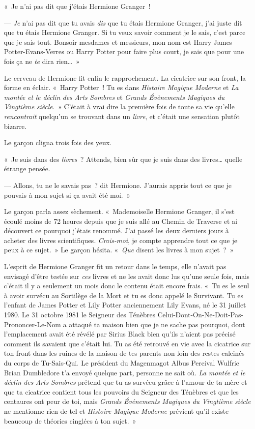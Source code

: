 «~Je n'ai pas dit que j'étais Hermione Granger~!

--- \emph{Je} n'ai pas dit que tu avais \emph{dis} que tu étais Hermione Granger, j'ai juste dit que tu étais Hermione Granger. Si tu veux savoir comment je le sais, c'est parce que je sais tout. Bonsoir mesdames et messieurs, mon nom est Harry James Potter-Evans-Verres ou Harry Potter pour faire plus court, je sais que pour une fois ça ne \emph{te} dira rien…~»

Le cerveau de Hermione fit enfin le rapprochement. La cicatrice sur son front, la forme en éclair. «~Harry Potter~! Tu es dans \emph{Histoire Magique Moderne} et \emph{La montée et le déclin des Arts Sombres} et \emph{Grands Évènements Magiques du Vingtième siècle}.~» C'était à vrai dire la première fois de toute sa vie qu'elle \emph{rencontrait} quelqu'un se trouvant dans un \emph{livre}, et c'était une sensation plutôt bizarre.

Le garçon cligna trois fois des yeux.

«~Je suis dans des \emph{livres}~? Attends, bien sûr que je suis dans des livres… quelle étrange pensée.

--- Allons, tu ne le savais pas~? dit Hermione. J'aurais appris tout ce que je pouvais à mon sujet si ça avait été moi.~»

Le garçon parla assez sèchement. «~Mademoiselle Hermione Granger, il s'est écoulé moins de 72 heures depuis que je suis allé au Chemin de Traverse et ai découvert ce pourquoi j'étais renommé. J'ai passé les deux derniers jours à acheter des livres scientifiques. \emph{Crois-moi}, je compte apprendre tout ce que je peux à ce sujet.~» Le garçon hésita. «~\emph{Que} disent les livres à mon sujet~?~»

L'esprit de Hermione Granger fit un retour dans le temps, elle n'avait pas envisagé d'être testée sur \emph{ces} livres et ne les avait donc lus qu'une seule fois, mais c'était il y a seulement un mois donc le contenu était encore frais. «~Tu es le seul à avoir survécu au Sortilège de la Mort et tu es donc appelé le Survivant. Tu es l'enfant de James Potter et Lily Potter anciennement Lily Evans, né le 31 juillet 1980. Le 31 octobre 1981 le Seigneur des Ténèbres Celui-Dont-On-Ne-Doit-Pas-Prononcer-Le-Nom a attaqué ta maison bien que je ne sache pas pourquoi, dont l'emplacement avait été révélé par Sirius Black bien qu'ils n'aient pas précisé comment ils savaient que c'était lui. Tu as été retrouvé en vie avec la cicatrice sur ton front dans les ruines de la maison de tes parents non loin des restes calcinés du corps de Tu-Sais-Qui. Le président du Magenmagot Albus Percival Wulfric Brian Dumbledore t'a envoyé quelque part, personne ne sait où. \emph{La montée et le déclin des Arts Sombres} prétend que tu as survécu grâce à l'amour de ta mère et que ta cicatrice contient tous les pouvoirs du Seigneur des Ténèbres et que les centaures ont peur de toi, mais \emph{Grands Événements Magiques du Vingtième siècle} ne mentionne rien de tel et \emph{Histoire Magique Moderne} prévient qu'il existe beaucoup de théories cinglées à ton sujet.~»

